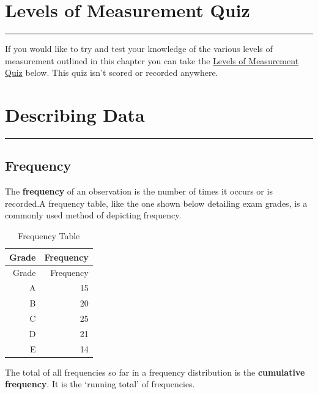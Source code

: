 \documentclass[
]{book}
\begin{document}
\hypertarget{levels-of-measurement-quiz}{%
\chapter{Levels of Measurement Quiz}\label{levels-of-measurement-quiz}}

\begin{center}\rule{0.5\linewidth}{0.5pt}\end{center}

If you would like to try and test your knowledge of the various levels of measurement outlined in this chapter you can take the \href{https://view.genial.ly/62867083cd8fd700184ca06f/presentation-quiz}{Levels of Measurement Quiz} below. This quiz isn't scored or recorded anywhere.

\hypertarget{describing-data}{%
\chapter{Describing Data}\label{describing-data}}

\begin{center}\rule{0.5\linewidth}{0.5pt}\end{center}

\hypertarget{frequency}{%
\section{Frequency}\label{frequency}}

The \textbf{frequency} of an observation is the number of times it occurs or is recorded.A frequency table, like the one shown below detailing exam grades, is a commonly used method of depicting frequency.

\begin{longtable}[]{@{}rr@{}}
\caption{\label{tab:table2}Frequency Table}\tabularnewline
\toprule
Grade & Frequency \\
\midrule
\endfirsthead
\toprule
Grade & Frequency \\
\midrule
\endhead
A & 15 \\
B & 20 \\
C & 25 \\
D & 21 \\
E & 14 \\
\bottomrule
\end{longtable}

The total of all frequencies so far in a frequency distribution is the \textbf{cumulative frequency}. It is the `running total' of frequencies.
\end{document}
